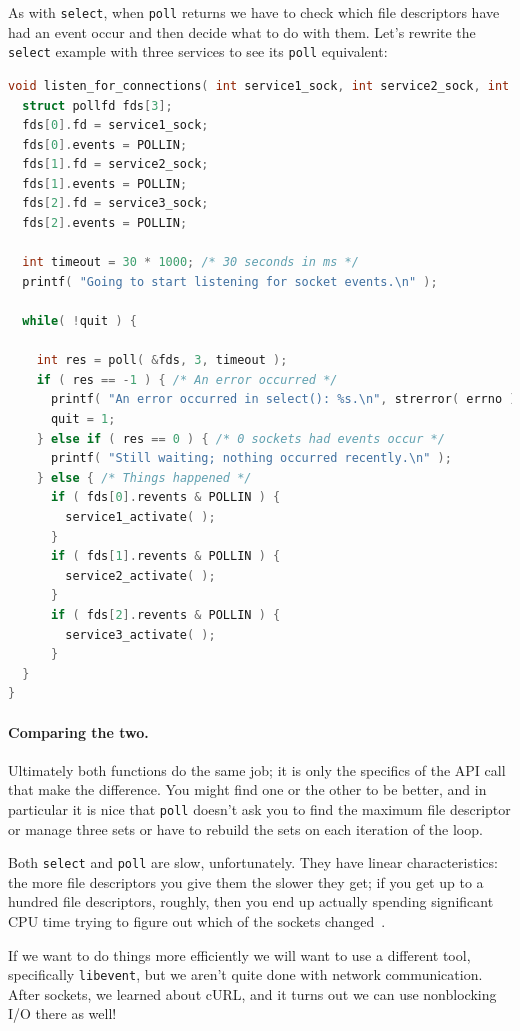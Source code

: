 \documentclass[a4paper]{report}
\begin{document}
As with \texttt{select}, when \texttt{poll} returns we have to check which file descriptors have had an event occur and then decide what to do with them. Let's rewrite the \texttt{select} example with three services to see its \texttt{poll} equivalent:

\begin{lstlisting}[language=C]
void listen_for_connections( int service1_sock, int service2_sock, int service3_sock ) {
  struct pollfd fds[3];
  fds[0].fd = service1_sock;
  fds[0].events = POLLIN;
  fds[1].fd = service2_sock;
  fds[1].events = POLLIN;
  fds[2].fd = service3_sock;
  fds[2].events = POLLIN;
 
  int timeout = 30 * 1000; /* 30 seconds in ms */ 
  printf( "Going to start listening for socket events.\n" );
  
  while( !quit ) {
    
    int res = poll( &fds, 3, timeout );
    if ( res == -1 ) { /* An error occurred */
      printf( "An error occurred in select(): %s.\n", strerror( errno ) );
      quit = 1;
    } else if ( res == 0 ) { /* 0 sockets had events occur */
      printf( "Still waiting; nothing occurred recently.\n" );
    } else { /* Things happened */
      if ( fds[0].revents & POLLIN ) {
        service1_activate( ); 
      }
      if ( fds[1].revents & POLLIN ) {
        service2_activate( ); 
      }
      if ( fds[2].revents & POLLIN ) {
        service3_activate( ); 
      }
  }
}
\end{lstlisting}


\paragraph{Comparing the two.}
Ultimately both functions do the same job; it is only the specifics of the API call that make the difference. You might find one or the other to be better, and in particular it is nice that \texttt{poll} doesn't ask you to find the maximum file descriptor or manage three sets or have to rebuild the sets on each iteration of the loop.

Both \texttt{select} and \texttt{poll} are slow, unfortunately. They have linear characteristics: the more file descriptors you give them the slower they get; if you get up to a hundred file descriptors, roughly, then you end up actually spending significant CPU time trying to figure out which of the sockets changed~\cite{pollvselect}.

If we want to do things more efficiently we will want to use a different tool, specifically \texttt{libevent}, but we aren't quite done with network communication. After sockets, we learned about cURL, and it turns out we can use nonblocking I/O there as well!
\end{document}

